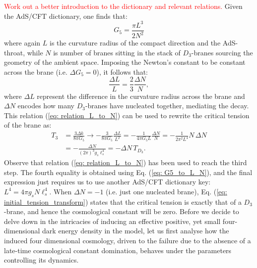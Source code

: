 \textcolor{red}{Work out a better introduction to the dictionary and relevant relations.} Given the AdS/CFT dictionary, one finds that:
\begin{equation}\label{eq: G5_to_L_N}
    G_{5} = \frac{\pi L^{3}}{2 N^{2}}
\end{equation}
where again $L$ is the curvature radius of the compact direction and the AdS-throat, while $N$ is number of branes sitting in the stack of $D_{3}$-branes sourcing the geometry of the ambient space. Imposing the Newton's constant to be constant across the brane (i.e. $\Delta G_5=0$), it follows that:
\begin{equation}\label{eq: relation_L_to_N}
    \frac{\Delta L}{L} = \frac{2}{3} \frac{\Delta N}{N} ,
\end{equation}
where $\Delta L$ represent the difference in the curvature radius across the brane and $\Delta N$ encodes how many $D_{3}$-branes have nucleated together, mediating the decay. This relation (\ref{eq: relation_L_to_N}) can be used to rewrite the critical tension of the brane as:
\begin{equation}\label{eq: initial_tension_transform}
    \begin{split}
        T_3 &=\frac{3\Delta k}{8 \pi G_5} \rightarrow -\frac{3}{8 \pi G_5} \frac{\Delta L}{L^2} = -\frac{1}{4 \pi G_5 L}\frac{\Delta N}{N} =  -\frac{1}{2 \pi^{2} L^{4}} N \, \Delta N\\
        & = - \frac{\Delta N}{(2\pi)^{3} g_{s} \ell_{s}^{4}} = -\Delta N \, T_{D_{3}}.
    \end{split}
\end{equation}
Observe that relation (\ref{eq: relation_L_to_N}) has been used to reach the third step. The fourth equality is obtained using Eq. (\ref{eq: G5_to_L_N}), and the final expression just requires us to use another AdS/CFT dictionary key: $L^{4} = 4 \pi g_{s} N \ell_{s}^{4}$. When $\Delta N = -1$ (i.e. just one nucleated brane), Eq. (\ref{eq: initial_tension_transform}) states that the critical tension is exactly that of a $D_{3}$-brane, and hence the cosmological constant will be zero. Before we decide to delve down in the intricacies of inducing an effective positive, yet small four-dimensional dark energy density in the model, let us first analyse how the induced four dimensional cosmology, driven to the failure due to the absence of a late-time cosmological constant domination, behaves under the parameters controlling its dynamics.

